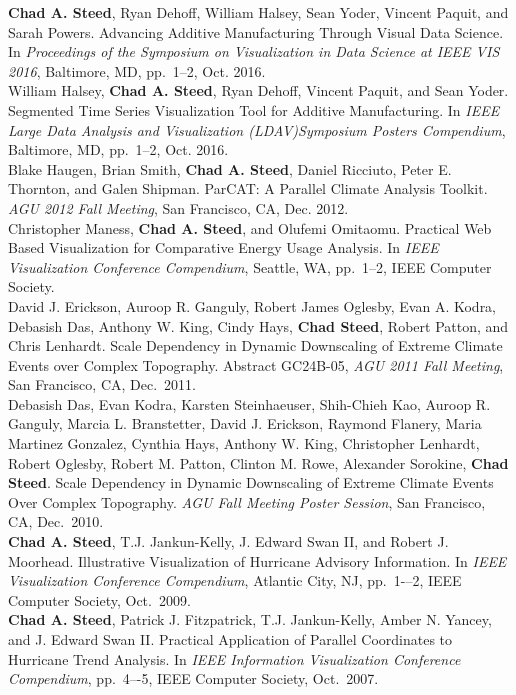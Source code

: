\documentclass[11pt, letterpaper]{article}
\newcommand{\years}[1]{\marginnote{\scriptsize #1}}
\begin{document}
 \noindent\years{2016}\textbf{Chad A. Steed}, Ryan Dehoff, William Halsey, Sean Yoder, Vincent Paquit, and Sarah Powers.  Advancing Additive Manufacturing Through Visual Data Science.  In \emph{Proceedings of the Symposium on Visualization in Data Science at IEEE VIS 2016}, Baltimore, MD, pp.\ 1--2, Oct. 2016.\\
\years{2016}William Halsey, \textbf{Chad A. Steed}, Ryan Dehoff,
Vincent Paquit, and Sean Yoder. Segmented Time Series Visualization Tool for
Additive Manufacturing.  In \emph{IEEE Large Data Analysis and Visualization
(LDAV)Symposium Posters Compendium}, Baltimore, MD, pp.\ 1--2, Oct. 2016.\\
\years{2012}Blake Haugen, Brian Smith, \textbf{Chad A. Steed},
Daniel Ricciuto, Peter E. Thornton, and Galen Shipman.  ParCAT: A Parallel
Climate Analysis Toolkit. \emph{AGU 2012 Fall Meeting}, San Francisco, CA, Dec. 2012.\\
\years{2012}Christopher Maness, \textbf{Chad A. Steed}, and
Olufemi Omitaomu. Practical Web Based Visualization for Comparative Energy
Usage Analysis.  In \emph{IEEE Visualization Conference Compendium}, Seattle, WA,
pp.\ 1--2, IEEE Computer Society.\\
\years{2011}David J. Erickson, Auroop R. Ganguly, Robert
James Oglesby, Evan A. Kodra, Debasish Das, Anthony W. King, Cindy Hays,
\textbf{Chad Steed}, Robert Patton, and Chris Lenhardt. Scale Dependency in
Dynamic Downscaling of Extreme Climate Events over Complex Topography.
Abstract GC24B-05, \emph{AGU 2011 Fall Meeting}, San Francisco, CA,
Dec.\ 2011.\\
\years{2010}Debasish Das, Evan Kodra, Karsten Steinhaeuser, Shih-Chieh Kao,
Auroop R. Ganguly, Marcia L. Branstetter, David J. Erickson, Raymond Flanery,
Maria Martinez Gonzalez, Cynthia Hays, Anthony W. King, Christopher Lenhardt,
Robert Oglesby, Robert M. Patton, Clinton M. Rowe, Alexander Sorokine,
\textbf{Chad Steed}.  Scale Dependency in Dynamic Downscaling of Extreme
Climate Events Over Complex Topography. \emph{AGU Fall Meeting Poster Session},
San Francisco, CA, Dec.\ 2010.\\
\years{2009}\textbf{Chad A. Steed}, T.J. Jankun-Kelly, J. Edward Swan II, and
Robert J. Moorhead. Illustrative Visualization of Hurricane Advisory
Information. In \emph{IEEE Visualization Conference Compendium}, Atlantic City, NJ,
pp.\ 1-–2, IEEE Computer Society, Oct.\ 2009.\\
\years{2007}\textbf{Chad A. Steed}, Patrick J. Fitzpatrick, T.J. Jankun-Kelly,
Amber N. Yancey, and J. Edward Swan II.  Practical Application of Parallel
Coordinates to Hurricane Trend Analysis.  In \emph{IEEE Information Visualization
Conference Compendium}, pp.\ 4–-5, IEEE Computer Society, Oct.\ 2007.
\end{document}
